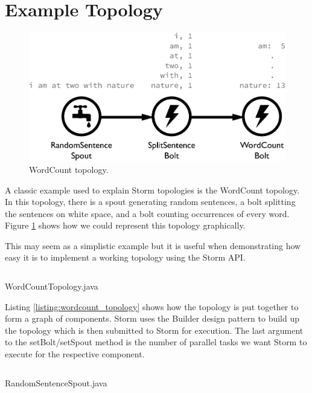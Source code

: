 \documentclass[bsc,logo,frontabs,twoside,singlespacing,normalheadings,parskip]{infthesis}     %
\begin{document}
\section{Example Topology}

\begin{figure}[!htb]
	\centering
	\includegraphics[scale=0.7]{pdf/wordcount_topology.pdf}
	\caption{WordCount topology.}
	\label{fig:wordcount_topology}
\end{figure}

A classic example used to explain Storm topologies is the WordCount topology. In this topology, there is a spout generating random sentences, a bolt splitting the sentences on white space, and a bolt counting occurrences of every word. Figure \ref{fig:wordcount_topology} shows how we could represent this topology graphically.

This may seem as a simplistic example but it is useful when demonstrating how easy it is to implement a working topology using the Storm API.

\begin{listing}[!htb]
\inputminted{java}{code/WordCountTopology.java}
\caption{WordCountTopology.java}
\label{listing:wordcount_topology}
\end{listing}

Listing \ref{listing:wordcount_topology} shows how the topology is put together to form a graph of components. Storm uses the Builder design pattern to build up the topology which is then submitted to Storm for execution. The last argument to the setBolt/setSpout method is the number of parallel tasks we want Storm to execute for the respective component.

\newpage

\begin{listing}[!htb]
\inputminted{java}{code/RandomSentenceSpout.java}
\caption{RandomSentenceSpout.java}
\label{listing:wordcount_spout}
\end{listing}
\end{document}
